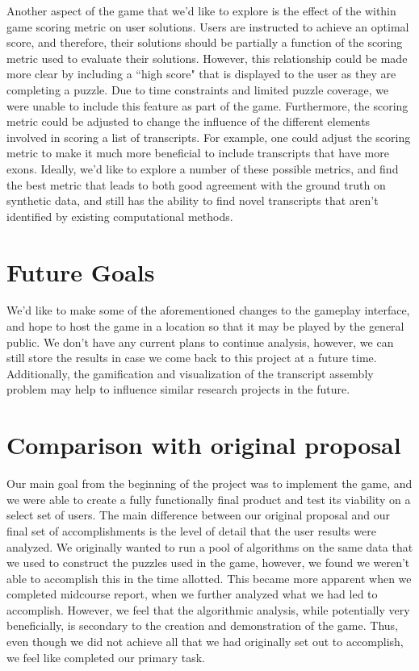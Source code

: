 \documentclass[12pt]{article}
\begin{document}
Another aspect of the game that we'd like to explore is the effect of the within game scoring metric on user solutions. Users are instructed to achieve an optimal score,
and therefore, their solutions should be partially a function of the scoring metric used to evaluate their solutions. However, this relationship could be made more clear by
including a ``high score" that is displayed to the user as they are completing a puzzle. Due to time constraints and limited puzzle coverage, we were unable to include this
feature as part of the game. Furthermore, the scoring metric could be adjusted to change the influence of the different elements involved in scoring a list of transcripts. For example,
one could adjust the scoring metric to make it much more beneficial to include transcripts that have more exons. Ideally, we'd like to explore a number of these possible
metrics, and find the best metric that leads to both good agreement with the ground truth on synthetic data, and still has the ability to find novel transcripts that aren't 
identified by existing computational methods.

\section*{Future Goals}

We'd like to make some of the aforementioned changes to the gameplay interface, and hope to host the game in a location so that it may be played by the general public.
We don't have any current plans to continue analysis, however, we can still store the results in case we come back to this project at a future time. Additionally, the gamification and
visualization of the transcript assembly problem may help to influence similar research projects in the future.

\section*{Comparison with original proposal}

Our main goal from the beginning of the project was to implement the game, and we were able to create a fully functionally final product and test its viability on a select set of users. The main
difference between our original proposal and our final set of accomplishments is the level of detail that the user results were analyzed. We originally wanted to run a pool of algorithms
on the same data that we used to construct the puzzles used in the game, however, we found we weren't able to accomplish this in the time allotted. This became more apparent when we
completed midcourse report, when we further analyzed what we had led to accomplish. However, we feel that the
 algorithmic analysis, while potentially very beneficially, is secondary to the creation and demonstration of the game. Thus, even though we did not achieve all that we had originally set out to
  accomplish, we feel like completed our primary task.
\end{document}
